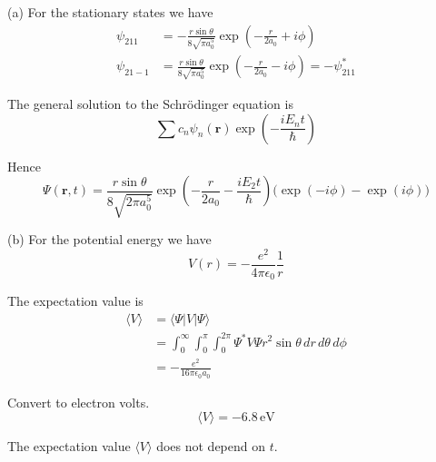 


\bigskip
(a) For the stationary states we have
\begin{align*}
\psi_{211}&=-\frac{r\sin\theta}{8\sqrt{\pi a_0^5}}\exp\left(-\frac{r}{2a_0}+i\phi\right)
\\
\psi_{21-1}&=\frac{r\sin\theta}{8\sqrt{\pi a_0^5}}\exp\left(-\frac{r}{2a_0}-i\phi\right)=-\psi_{211}^*
\end{align*}

The general solution to the Schr\"odinger equation is
\begin{equation*}
\sum c_n\psi_n(\mathbf r)\exp\left(-\frac{iE_nt}{\hbar}\right)\tag{4.9}
\end{equation*}

Hence
\begin{equation*}
\Psi(\mathbf r,t)=\frac{r\sin\theta}{8\sqrt{2\pi a_0^5}}
\exp\left(-\frac{r}{2a_0}-\frac{iE_2t}{\hbar}\right)
\bigl(\exp(-i\phi)-\exp(i\phi)\bigr)
\end{equation*}

(b) For the potential energy we have
\begin{equation*}
V(r)=-\frac{e^2}{4\pi\epsilon_0}\frac{1}{r}\tag{4.52}
\end{equation*}

The expectation value is
\begin{align*}
\langle V\rangle&=\langle\Psi|V|\Psi\rangle
\\
&=\int_0^\infty\int_0^\pi\int_0^{2\pi}
\Psi^*V\Psi r^2\sin\theta\,dr\,d\theta\,d\phi
\\
&=-\frac{e^2}{16\pi\epsilon_0a_0}\tag{1}
\end{align*}

Convert to electron volts.
\begin{equation*}
\langle V\rangle=-6.8\,\text{eV}
\end{equation*}

The expectation value $\langle V\rangle$ does not depend on $t$.


